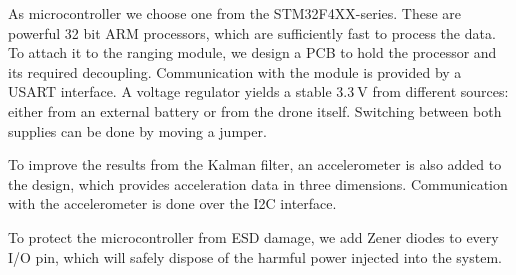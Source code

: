 \documentclass[a4paper]{article}        %
\begin{document}
  As microcontroller we choose one from the STM32F4XX-series. These are powerful 32 bit ARM processors, which are sufficiently fast to process the data.
  To attach it to the ranging module, we design a PCB to hold the processor and its required decoupling. Communication with the module is provided by a USART interface.
  A voltage regulator yields a stable $\SI{3.3}{\volt}$ from different sources: either from an external battery or from the drone itself. Switching between both supplies can be done by moving a jumper.

  To improve the results from the Kalman filter, an accelerometer is also added to the design, which provides acceleration data in three dimensions. Communication with the accelerometer is done over the I2C interface.

  To protect the microcontroller from ESD damage, we add Zener diodes to every I/O pin, which will safely dispose of the harmful power injected into the system.

  
\end{document}
